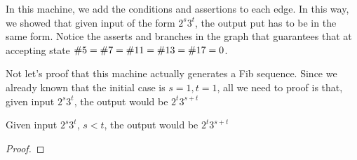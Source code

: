 In this machine, we add the conditions and assertions to each edge.
In this way, we showed that given input of the form $2^s3^t$, the output put has to be in the same form.
Notice the asserts and branches in the graph that guarantees that at accepting state $\V = \VII = \XI = \XIII = \XVII = 0$.

Not let's proof that this machine actually generates a Fib sequence.
Since we already known that the initial case is $s = 1, t = 1$, all we need to proof is that, given input $2^s3^t$, the output would be $2^t3^{s+t}$

\begin{theorem}
    Given input $2^s3^t$, $s < t$, the output would be $2^t3^{s+t}$
\end{theorem}

\begin{proof}


\end{proof}
